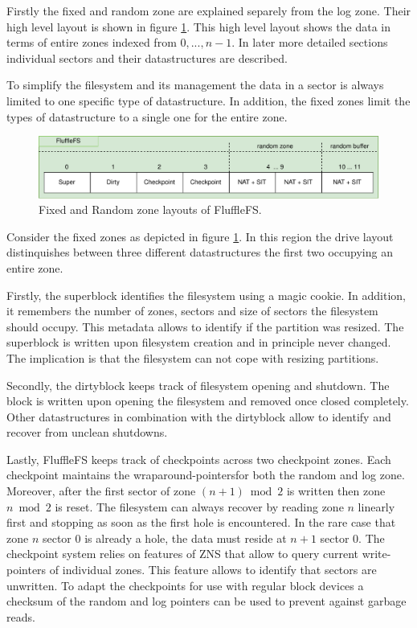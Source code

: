 Firstly the fixed and random zone are explained separely from the log zone.
Their high level layout is shown in figure \ref{figure:flufflelayout}. This high
level layout shows the data in terms of entire zones indexed from ${0,...,n-1}$.
In later more detailed sections individual sectors and their datastructures
are described.

To simplify the filesystem and its management the data in a sector is always
limited to one specific type of datastructure. In addition, the fixed zones
limit the types of datastructure to a single one for the entire zone.

\begin{figure}[h!]
    \centering
	\includegraphics[width=1\textwidth]{resources/images/fluffle-layout.pdf}
	\caption{Fixed and Random zone layouts of FluffleFS.}
    \label{figure:flufflelayout}
\end{figure}

Consider the fixed zones as depicted in figure \ref{figure:flufflelayout}. In
this region the drive layout distinquishes between three different
datastructures the first two occupying an entire zone.

Firstly, the superblock identifies the filesystem using a magic cookie. In
addition, it remembers the number of zones, sectors and size of sectors the
filesystem should occupy. This metadata allows to identify if the partition was
resized. The superblock is written upon filesystem creation and in principle
never changed. The implication is that the filesystem can not cope with resizing
partitions.

Secondly, the dirtyblock keeps track of filesystem opening and shutdown. The 
block is written upon opening the filesystem and removed once closed completely.
Other datastructures in combination with the dirtyblock allow to identify and
recover from unclean shutdowns.

Lastly, FluffleFS keeps track of checkpoints across two checkpoint zones. Each
checkpoint maintains the wraparound-pointers\footnotemark[12] for both the random
and log zone. Moreover, after the first sector of zone $(n+1) \bmod{2}$ is
written then zone $n \bmod{2}$ is reset. The filesystem can always recover by
reading zone $n$ linearly first and stopping as soon as the first hole is
encountered. In the rare case that zone $n$ sector $0$ is already a hole, the
data must reside at $n+1$ sector $0$. The checkpoint system relies on features
of ZNS that allow to query current write-pointers of individual zones. This
feature allows to identify that sectors are unwritten. To adapt the checkpoints
for use with regular block devices a checksum of the random and log pointers can
be used to prevent against garbage reads.

